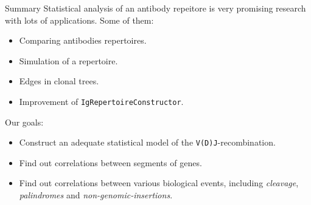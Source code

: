 \documentclass{beamer}\usepackage[]{graphicx}\usepackage[]{color}
\begin{document}



\begin{frame}{Summary}
  Statistical analysis of an antibody repeitore is very promising research with lots of applications. Some of them:
  \begin{itemize}
    \item Comparing antibodies repertoires.
    \item Simulation of a repertoire.
    \item Edges in clonal trees.
    \item Improvement of \texttt{IgRepertoireConstructor}.
  \end{itemize}

  \bigskip
 Our goals: 
  \begin{itemize}
    \item Construct an adequate statistical model of the \texttt{V(D)J}-recombination.
    \item Find out correlations between segments of genes.
    \item Find out correlations between various biological events, including \textit{cleavage}, \textit{palindromes} and \textit{non-genomic-insertions}.
  \end{itemize}
\end{frame}
\end{document}
